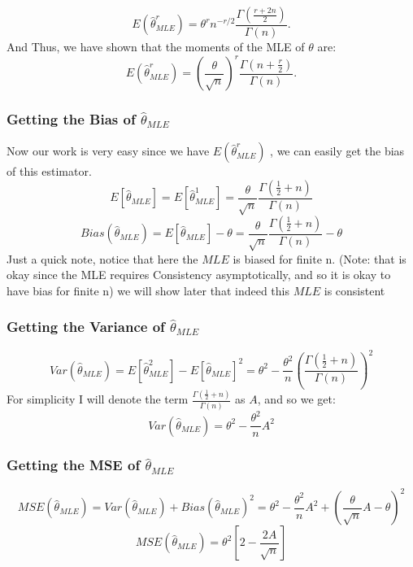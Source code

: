 \documentclass[12pt]{article}
\begin{document}
\[
  E(\hat{\theta}^r_{MLE}) = \theta^r n^{-r/2} \frac{\Gamma\left(\frac{r + 2n}{2}\right)}{\Gamma(n)}.
\]
And Thus, we have shown that the moments of the MLE of \(\theta\) are:
\[
  E(\hat{\theta}^r_{MLE}) = (\frac{\theta}{\sqrt{n}})^r \frac{ \Gamma\left( n+\frac{r}{2} \right) }{ \Gamma(n) }.
\]
\subsubsection*{Getting the Bias of $\hat{\theta}_{MLE}$}
Now our work is very easy since we have $E(\hat{\theta}^r_{MLE})$ , we can easily get the bias of this estimator.
\[
  E[\hat{\theta}_{MLE}] = E[\hat{\theta}^1_{MLE}] = \frac{\theta}{\sqrt{n}} \frac{\Gamma(\frac{1}{2}+n)}{\Gamma(n)}
\]
\[
  Bias(\hat{\theta}_{MLE}) = E[\hat{\theta}_{MLE}] - \theta = \frac{\theta}{\sqrt{n}} \frac{\Gamma(\frac{1}{2}+n)}{\Gamma(n)} - \theta
\]
Just a quick note, notice that here the $MLE$ is biased for finite n. (Note: that is okay since the MLE requires Consistency asymptotically, and so it is okay to have bias for finite n) we will show later that indeed this $MLE$ is consistent\\

\subsubsection*{Getting the Variance of $\hat{\theta}_{MLE}$}
\[
  Var(\hat{\theta}_{MLE}) = E[\hat{\theta}^2_{MLE}] - E[\hat{\theta}_{MLE}]^2 = \theta^2 - \frac{\theta^2}{n}(\frac{\Gamma(\frac{1}{2}+n)}{\Gamma(n)})^2
\]
For simplicity I will denote the term $\frac{\Gamma(\frac{1}{2}+n)}{\Gamma(n)}$ as $A$, and so we get:
\[
  Var(\hat{\theta}_{MLE}) = \theta^2 - \frac{\theta^2}{n}A^2
\]
\subsubsection*{Getting the MSE of $\hat{\theta}_{MLE}$}
\[
  MSE(\hat{\theta}_{MLE}) = Var(\hat{\theta}_{MLE}) + Bias(\hat{\theta}_{MLE})^2 = \theta^2 - \frac{\theta^2}{n}A^2 + \left( \frac{\theta}{\sqrt{n}} A - \theta \right)^2
\]
\[
  MSE(\hat{\theta}_{MLE}) = \theta^2[2-\frac{2A}{\sqrt{n}}]
\]
\end{document}
